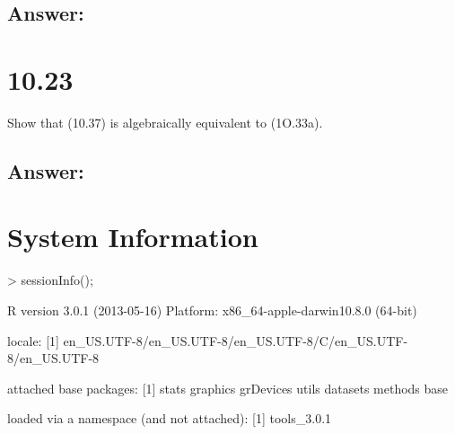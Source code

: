 \documentclass{article}
\begin{document}
\subsection{Answer:}

\section{10.23}

Show that (10.37) is algebraically equivalent to (1O.33a).

\subsection{Answer:}

\section{System Information}

\begin{Schunk}
\begin{Sinput}
> sessionInfo();
\end{Sinput}
\begin{Soutput}
R version 3.0.1 (2013-05-16)
Platform: x86_64-apple-darwin10.8.0 (64-bit)

locale:
[1] en_US.UTF-8/en_US.UTF-8/en_US.UTF-8/C/en_US.UTF-8/en_US.UTF-8

attached base packages:
[1] stats     graphics  grDevices utils     datasets  methods   base     

loaded via a namespace (and not attached):
[1] tools_3.0.1
\end{Soutput}
\end{Schunk}
\end{document}
